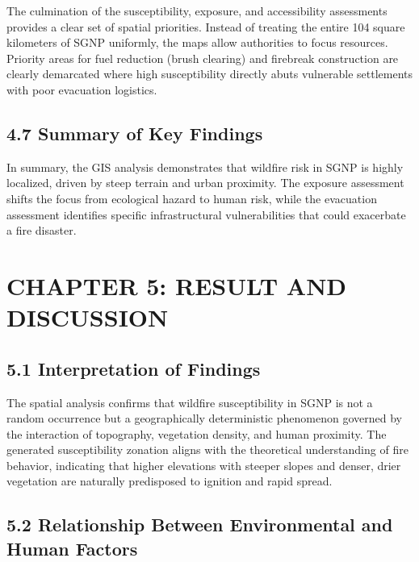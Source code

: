\documentclass[12pt,a4paper]{article}
\begin{document}
The culmination of the susceptibility, exposure, and accessibility assessments provides a clear set of spatial priorities. Instead of treating the entire 104 square kilometers of SGNP uniformly, the maps allow authorities to focus resources. Priority areas for fuel reduction (brush clearing) and firebreak construction are clearly demarcated where high susceptibility directly abuts vulnerable settlements with poor evacuation logistics.



\subsection*{4.7 Summary of Key Findings}

In summary, the GIS analysis demonstrates that wildfire risk in SGNP is highly localized, driven by steep terrain and urban proximity. The exposure assessment shifts the focus from ecological hazard to human risk, while the evacuation assessment identifies specific infrastructural vulnerabilities that could exacerbate a fire disaster.



\clearpage
\section*{CHAPTER 5: RESULT AND DISCUSSION}


\subsection*{5.1 Interpretation of Findings}

The spatial analysis confirms that wildfire susceptibility in SGNP is not a random occurrence but a geographically deterministic phenomenon governed by the interaction of topography, vegetation density, and human proximity. The generated susceptibility zonation aligns with the theoretical understanding of fire behavior, indicating that higher elevations with steeper slopes and denser, drier vegetation are naturally predisposed to ignition and rapid spread.



\subsection*{5.2 Relationship Between Environmental and Human Factors}
\end{document}
